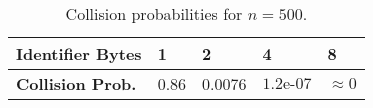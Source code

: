 \begin{table}[ht]
  \centering
  \begin{tabular}{|l|l|l|l|l|}
    \hline
    \textbf{Identifier Bytes} & 1 & 2 & 4 & 8 \\
    \hline
    \textbf{Collision Prob.}
    & 0.86 & 0.0076 & $1.2\text{e-07}$ & ${\approx}0$ \\
    \hline
  \end{tabular}
  \caption{Collision probabilities for $n=500$.
  }
  \label{tab:quack:collision-prob}
\end{table}
